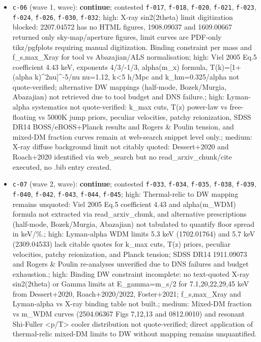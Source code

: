 \documentclass[11pt,a4paper]{article}
\begin{document}
\begin{itemize}
  \item \texttt{c-06} (wave 1, wave): \textbf{continue}; contested \texttt{f-017}, \texttt{f-018}, \texttt{f-020}, \texttt{f-021}, \texttt{f-023}, \texttt{f-024}, \texttt{f-026}, \texttt{f-030}, \texttt{f-032}; high: X-ray sin2(2theta) limit digitization blocked: 2207.04572 has no HTML figures, 1908.09037 and 1609.00667 returned only sky-map/aperture figures, limit curves are PDF-only tikz/pgfplots requiring manual digitization. Binding constraint per mass and f\_s,max\_Xray for tool vs Abazajian/ALS normalisation; high: Viel 2005 Eq.5 coefficient 4.43 keV, exponents 4/3/-1/3, alpha(m\_x) formula, T(k)=[1+(alpha k)\textasciicircum{}2nu]\textasciicircum{}-5/nu nu=1.12, k\textless{}5 h/Mpc and k\_hm=0.325/alpha not quote-verified; alternative DW mappings (half-mode, Bozek/Murgia, Abazajian) not retrieved due to tool budget and DNS failure.; high: Lyman-alpha systematics not quote-verified: k\_max cuts, T(z) power-law vs free-floating vs 5000K jump priors, peculiar velocities, patchy reionization, SDSS DR14 BOSS/eBOSS+Planck results and Rogers \& Poulin tension, and mixed-DM fraction curves remain at web-search snippet level only.; medium: X-ray diffuse background limit not citably quoted: Dessert+2020 and Roach+2020 identified via web\_search but no read\_arxiv\_chunk/cite executed, no .bib entry created.
  \item \texttt{c-07} (wave 2, wave): \textbf{continue}; contested \texttt{f-033}, \texttt{f-034}, \texttt{f-035}, \texttt{f-038}, \texttt{f-039}, \texttt{f-040}, \texttt{f-042}, \texttt{f-043}, \texttt{f-044}, \texttt{f-045}; high: Thermal-relic to DW mapping remains unquoted: Viel 2005 Eq.5 coefficient 4.43 and alpha(m\_WDM) formula not extracted via read\_arxiv\_chunk, and alternative prescriptions (half-mode, Bozek/Murgia, Abazajian) not tabulated to quantify floor spread in keV/\%.; high: Lyman-alpha WDM limits 5.3 keV (1702.01764) and 5.7 keV (2309.04533) lack citable quotes for k\_max cuts, T(z) priors, peculiar velocities, patchy reionization, and Planck tension; SDSS DR14 1911.09073 and Rogers \& Poulin re-analyses unverified due to DNS failures and budget exhaustion.; high: Binding DW constraint incomplete: no text-quoted X-ray sin2(2theta) or Gamma limits at E\_gamma=m\_s/2 for 7.1,20,22,29,45 keV from Dessert+2020, Roach+2020/2022, Foster+2021; f\_s,max\_Xray and Lyman-alpha vs X-ray binding table not built.; medium: Mixed-DM fraction vs m\_WDM curves (2504.06367 Figs 7,12,13 and 0812.0010) and resonant Shi-Fuller \textless{}p/T\textgreater{} cooler distribution not quote-verified; direct application of thermal-relic mixed-DM limits to DW without mapping remains unquantified.

\end{itemize}
\end{document}

